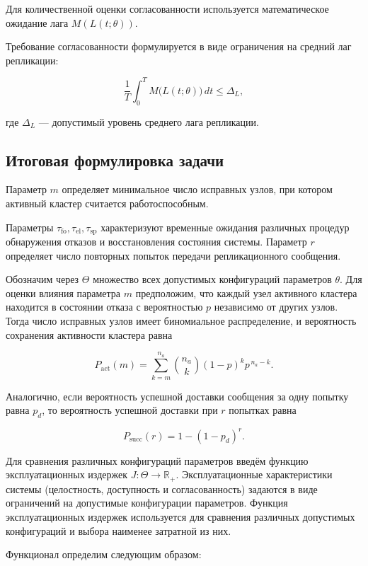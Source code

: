 Для количественной оценки согласованности
используется математическое ожидание лага
$M(L(t;\theta))$.

Требование согласованности формулируется в виде ограничения
на средний лаг репликации:

\begin{equation}
\frac{1}{T}
\int_{0}^{T}
M\bigl(L(t;\theta)\bigr)\,dt
\le
\Delta_L,
\label{eq:consistency_log}
\end{equation}

где $\Delta_L$ — допустимый уровень среднего лага репликации.

\subsection{Итоговая формулировка задачи}

Параметр $m$ определяет минимальное число исправных узлов,
при котором активный кластер считается работоспособным.

Параметры
$\tau_{\mathrm{fo}}, \tau_{\mathrm{el}}, \tau_{\mathrm{sp}}$
характеризуют временные ожидания различных процедур
обнаружения отказов и восстановления состояния системы.
Параметр $r$ определяет число повторных попыток передачи
репликационного сообщения.

Обозначим через $\Theta$
множество всех допустимых конфигураций параметров $\theta$.
Для оценки влияния параметра $m$ предположим,
что каждый узел активного кластера находится в состоянии отказа
с вероятностью $p$ независимо от других узлов.
Тогда число исправных узлов имеет биномиальное распределение,
и вероятность сохранения активности кластера равна

\[
P_{\mathrm{act}}(m)
=
\sum_{k=m}^{n_a}
\binom{n_a}{k}
(1-p)^k p^{\,n_a-k}.
\]

Аналогично,
если вероятность успешной доставки сообщения за одну попытку равна $p_d$,
то вероятность успешной доставки при $r$ попытках равна

\[
P_{\mathrm{succ}}(r)
=
1-(1-p_d)^r.
\]

Для сравнения различных конфигураций параметров
введём функцию эксплуатационных издержек
$
J:\Theta\to\mathbb{R}_{+}.
$
Эксплуатационные характеристики системы
(целостность, доступность и согласованность)
задаются в виде ограничений на допустимые конфигурации параметров.
Функция эксплуатационных издержек используется
для сравнения различных допустимых конфигураций
и выбора наименее затратной из них.

Функционал определим следующим образом:

